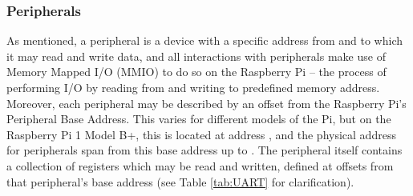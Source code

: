     \subsubsection{Peripherals}
        As mentioned, a peripheral is a device with a specific address from and
        to which it may read and write data, and all interactions with
        peripherals make use of Memory Mapped I/O (MMIO) to do so on the
        Raspberry Pi -- the process of performing I/O by reading from and
        writing to predefined memory address. Moreover, each peripheral may be
        described by an offset from the Raspberry Pi's Peripheral Base Address.
        This varies for different models of the Pi, but on the Raspberry Pi 1
        Model B+, this is located at address , and the physical
        address for peripherals span from this base address up to
        . The peripheral itself contains a collection of
        registers which may be read and written, defined at offsets from that
        peripheral's base address (see Table \ref{tab:UART} for clarification).

